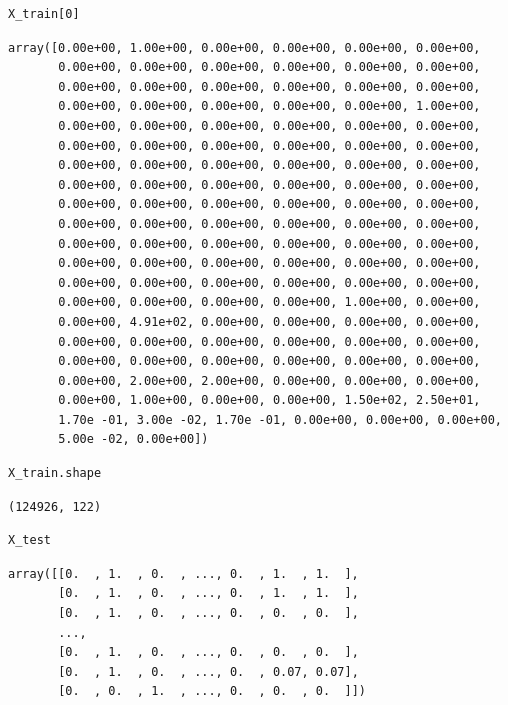 \begin{verbatim}
X_train[0]
\end{verbatim}

\begin{verbatim}
array([0.00e+00, 1.00e+00, 0.00e+00, 0.00e+00, 0.00e+00, 0.00e+00,
       0.00e+00, 0.00e+00, 0.00e+00, 0.00e+00, 0.00e+00, 0.00e+00,
       0.00e+00, 0.00e+00, 0.00e+00, 0.00e+00, 0.00e+00, 0.00e+00,
       0.00e+00, 0.00e+00, 0.00e+00, 0.00e+00, 0.00e+00, 1.00e+00,
       0.00e+00, 0.00e+00, 0.00e+00, 0.00e+00, 0.00e+00, 0.00e+00,
       0.00e+00, 0.00e+00, 0.00e+00, 0.00e+00, 0.00e+00, 0.00e+00,
       0.00e+00, 0.00e+00, 0.00e+00, 0.00e+00, 0.00e+00, 0.00e+00,
       0.00e+00, 0.00e+00, 0.00e+00, 0.00e+00, 0.00e+00, 0.00e+00,
       0.00e+00, 0.00e+00, 0.00e+00, 0.00e+00, 0.00e+00, 0.00e+00,
       0.00e+00, 0.00e+00, 0.00e+00, 0.00e+00, 0.00e+00, 0.00e+00,
       0.00e+00, 0.00e+00, 0.00e+00, 0.00e+00, 0.00e+00, 0.00e+00,
       0.00e+00, 0.00e+00, 0.00e+00, 0.00e+00, 0.00e+00, 0.00e+00,
       0.00e+00, 0.00e+00, 0.00e+00, 0.00e+00, 0.00e+00, 0.00e+00,
       0.00e+00, 0.00e+00, 0.00e+00, 0.00e+00, 1.00e+00, 0.00e+00,
       0.00e+00, 4.91e+02, 0.00e+00, 0.00e+00, 0.00e+00, 0.00e+00,
       0.00e+00, 0.00e+00, 0.00e+00, 0.00e+00, 0.00e+00, 0.00e+00,
       0.00e+00, 0.00e+00, 0.00e+00, 0.00e+00, 0.00e+00, 0.00e+00,
       0.00e+00, 2.00e+00, 2.00e+00, 0.00e+00, 0.00e+00, 0.00e+00,
       0.00e+00, 1.00e+00, 0.00e+00, 0.00e+00, 1.50e+02, 2.50e+01,
       1.70e -01, 3.00e -02, 1.70e -01, 0.00e+00, 0.00e+00, 0.00e+00,
       5.00e -02, 0.00e+00])
\end{verbatim}

\begin{verbatim}
X_train.shape
\end{verbatim}

\begin{verbatim}
(124926, 122)
\end{verbatim}

\begin{verbatim}
X_test
\end{verbatim}

\begin{verbatim}
array([[0.  , 1.  , 0.  , ..., 0.  , 1.  , 1.  ],
       [0.  , 1.  , 0.  , ..., 0.  , 1.  , 1.  ],
       [0.  , 1.  , 0.  , ..., 0.  , 0.  , 0.  ],
       ...,
       [0.  , 1.  , 0.  , ..., 0.  , 0.  , 0.  ],
       [0.  , 1.  , 0.  , ..., 0.  , 0.07, 0.07],
       [0.  , 0.  , 1.  , ..., 0.  , 0.  , 0.  ]])
\end{verbatim}

